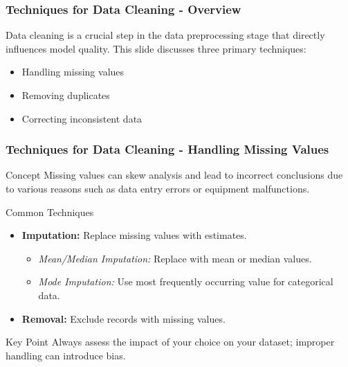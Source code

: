 \documentclass[aspectratio=169]{beamer}
\begin{document}
\begin{frame}[fragile]
    \frametitle{Techniques for Data Cleaning - Overview}
    Data cleaning is a crucial step in the data preprocessing stage that directly influences model quality. This slide discusses three primary techniques:
    \begin{itemize}
        \item Handling missing values
        \item Removing duplicates
        \item Correcting inconsistent data
    \end{itemize}
\end{frame}

\begin{frame}[fragile]
    \frametitle{Techniques for Data Cleaning - Handling Missing Values}
    \begin{block}{Concept}
        Missing values can skew analysis and lead to incorrect conclusions due to various reasons such as data entry errors or equipment malfunctions.
    \end{block}

    \begin{block}{Common Techniques}
        \begin{itemize}
            \item \textbf{Imputation:} Replace missing values with estimates.
            \begin{itemize}
                \item \textit{Mean/Median Imputation:} Replace with mean or median values.
                \item \textit{Mode Imputation:} Use most frequently occurring value for categorical data.
            \end{itemize}
            \item \textbf{Removal:} Exclude records with missing values.
        \end{itemize}
    \end{block}

    \begin{block}{Key Point}
        Always assess the impact of your choice on your dataset; improper handling can introduce bias.
    \end{block}
\end{frame}
\end{document}
